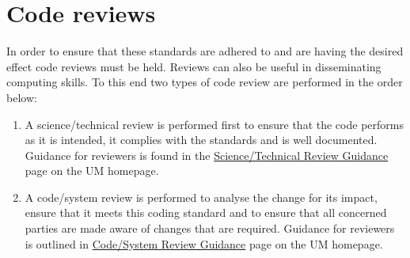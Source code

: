 \section{Code reviews}
\label{sec:reviews}

In order to ensure that these standards are adhered to and are having the desired effect code reviews must be held. Reviews can also be useful in disseminating computing skills. To this end two types of code review are performed in the order below: 

\begin{enumerate}
  \item A science/technical review is performed first to ensure that the code
  performs as it is intended, it complies with the standards and is well
  documented.  Guidance for reviewers is found in the \href{https://code.metoffice.gov.uk/trac/um/wiki/WorkingPractices/SciReviewGuidance}{Science/Technical Review Guidance} page on the UM homepage.
  \item A code/system review is performed to analyse the change for its 
  impact, ensure that it meets this coding standard  
  and to ensure that all concerned parties are made aware of changes that are
  required.  Guidance for reviewers is outlined in \href{https://code.metoffice.gov.uk/trac/um/wiki/WorkingPractices/CodeReviewGuidance}{Code/System Review Guidance} page on the UM homepage.  

\end{enumerate}
